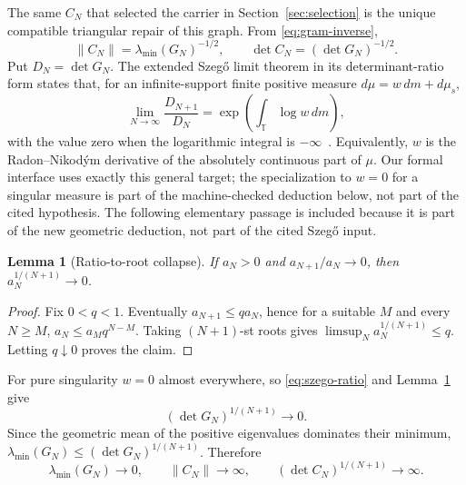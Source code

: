 \documentclass[11pt]{article}
\newtheorem{lemma}[theorem]{Lemma}
\newcommand{\T}{\mathbb T}
\begin{document}
The same $C_N$ that selected the carrier in Section~\ref{sec:selection} is the unique compatible
triangular repair of this graph.  From \eqref{eq:gram-inverse},
\begin{equation}\label{eq:norm-law}
  \|C_N\|=\lambda_{\min}(G_N)^{-1/2},
  \qquad
  \det C_N=(\det G_N)^{-1/2}.
\end{equation}
Put $D_N=\det G_N$.  The extended Szeg\H{o} limit theorem in its determinant-ratio form
states that, for an infinite-support finite positive measure
$d\mu=w\,dm+d\mu_s$,
\begin{equation}\label{eq:szego-ratio}
  \lim_{N\to\infty}\frac{D_{N+1}}{D_N}
  =\exp\left(\int_{\T}\log w\,dm\right),
\end{equation}
with the value zero when the logarithmic integral is $-\infty$~\cite[Theorem~1]{Lyons2003}.
Equivalently, $w$ is the Radon--Nikod\'ym derivative of the absolutely continuous part of $\mu$.
Our formal interface uses exactly this general target; the specialization to $w=0$ for a singular
measure is part of the machine-checked deduction below, not part of the cited hypothesis.
The following elementary passage is included because it is part of the new geometric deduction,
not part of the cited Szeg\H{o} input.

\begin{lemma}[Ratio-to-root collapse]\label{lem:ratio-root}
If $a_N>0$ and $a_{N+1}/a_N\to0$, then
$a_N^{1/(N+1)}\to0$.
\end{lemma}

\begin{proof}
Fix $0<q<1$.  Eventually $a_{N+1}\leq q a_N$, hence for a suitable $M$ and every $N\geq M$,
$a_N\leq a_Mq^{N-M}$.  Taking $(N+1)$-st roots gives
$\limsup_N a_N^{1/(N+1)}\leq q$.  Letting $q\downarrow0$ proves the claim.
\end{proof}

For pure singularity $w=0$ almost everywhere, so \eqref{eq:szego-ratio} and
Lemma~\ref{lem:ratio-root} give
\begin{equation}\label{eq:szego}
  (\det G_N)^{1/(N+1)}\longrightarrow0.
\end{equation}
Since the geometric mean of the positive eigenvalues dominates their minimum,
$\lambda_{\min}(G_N)\leq(\det G_N)^{1/(N+1)}$.  Therefore
\begin{equation}\label{eq:divergence}
  \lambda_{\min}(G_N)\longrightarrow0,\qquad
  \|C_N\|\longrightarrow\infty,\qquad
  (\det C_N)^{1/(N+1)}\longrightarrow\infty.
\end{equation}
\end{document}
